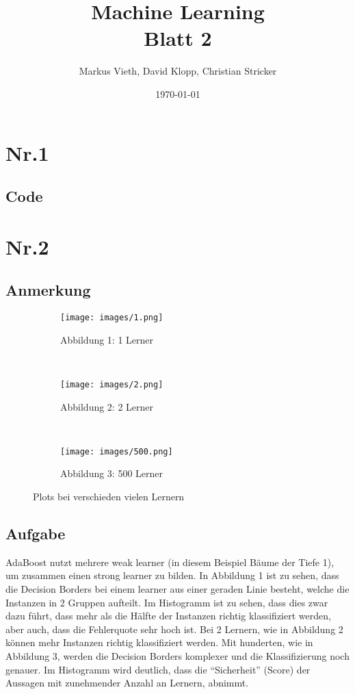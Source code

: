 \documentclass[a4paper,11pt,twoside]{article}
\title{Machine Learning\\ Blatt 2}
\author{Markus Vieth, David Klopp, Christian Stricker}
\date{\today}
\begin{document}
\newcommand{\cor}[1]{\textcolor{red}{\textit{#1}}}
\maketitle
\cleardoublepage
\pagestyle{myheadings}

\section*{Nr.1}
\subsection*{Code}


\newpage

\section*{Nr.2}
\subsection*{Anmerkung}
\begin{figure*}[t!]
	\centering
	\begin{subfigure}[t]{0.33\textwidth}
		\texttt{[image: images/1.png]}
		\caption{Abbildung 1: 1 Lerner}
	\end{subfigure}%
	~
	\begin{subfigure}[t]{0.33\textwidth}
		\texttt{[image: images/2.png]}
		\caption{Abbildung 2: 2 Lerner}
	\end{subfigure}%
	~
	\begin{subfigure}[t]{0.33\textwidth}
		\texttt{[image: images/500.png]}
		\caption{Abbildung 3: 500 Lerner}
	\end{subfigure}
	
	\caption*{Plots bei verschieden vielen Lernern}
\end{figure*}

\subsection*{Aufgabe}
AdaBoost nutzt mehrere weak learner (in diesem Beispiel Bäume der Tiefe 1), um zusammen einen strong learner zu bilden. In Abbildung 1 ist zu sehen, dass die Decision Borders bei einem learner aus einer geraden Linie besteht, welche die Instanzen in 2 Gruppen aufteilt. Im Histogramm ist zu sehen, dass dies zwar dazu führt, dass mehr als die Hälfte der Instanzen richtig klassifiziert werden, aber auch, dass die Fehlerquote sehr hoch ist. Bei 2 Lernern, wie in Abbildung 2 können mehr Instanzen richtig klassifiziert werden. Mit hunderten, wie in Abbildung 3, werden die Decision Borders komplexer und die Klassifizierung noch genauer. Im Histogramm wird deutlich, dass die "`Sicherheit"' (Score) der Aussagen mit zunehmender Anzahl an Lernern, abnimmt.
\end{document}
